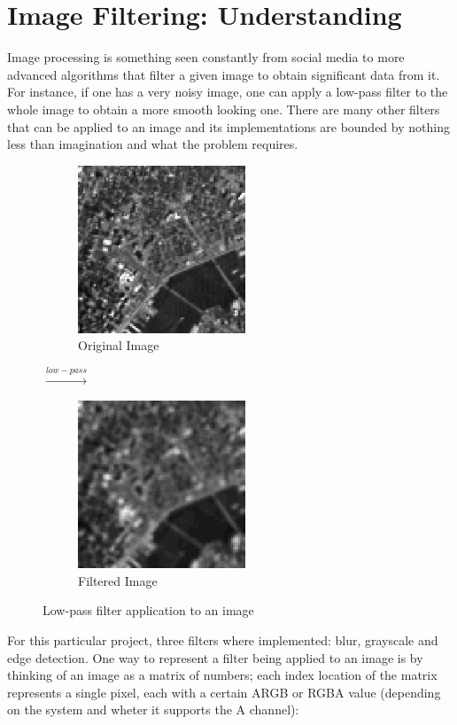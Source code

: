 \documentclass[a4paper,12pt]{article}
\begin{document}
	\section{Image Filtering: Understanding}
	
	Image processing is something seen constantly from social media to more advanced algorithms that filter a given image to obtain significant data from it. For instance, if one has a very noisy image, one can apply a low-pass filter to the whole image to obtain a more smooth looking one. There are many other filters that can be applied to an image and its implementations are bounded by nothing less than imagination and what the problem requires.\\
	
	\vfill
	
	\begin{figure}[h]
		\centering
		\begin{subfigure}{.47\textwidth}
			\centering
			\includegraphics[width=5cm]{originalLOWPASS.png}
			\caption{Original Image}
		\end{subfigure}%
		{\LARGE$\xrightarrow{low-pass}$}%
		\begin{subfigure}{.47\textwidth}
			\centering
			\includegraphics[width=5cm]{smoothLOWPAS.png}
			\caption{Filtered Image}
		\end{subfigure}

		\caption{Low-pass filter application to an image}
	\end{figure}	
	
	For this particular project, three filters where implemented: blur, grayscale and edge detection. One way to represent a filter being applied to an image is by thinking of an image as a matrix of numbers; each index location of the matrix represents a single pixel, each with a certain ARGB or RGBA value (depending on the system and wheter it supports the A channel):\\
	
\end{document}
